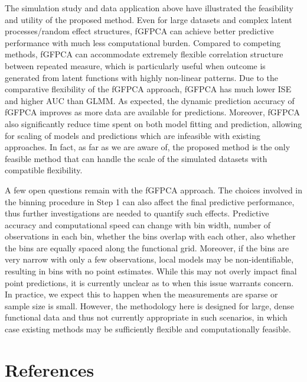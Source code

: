 \documentclass[
  11pt,
]{article}
\begin{document}
The simulation study and data application above have illustrated the
feasibility and utility of the proposed method. Even for large datasets
and complex latent processes/random effect structures, fGFPCA can
achieve better predictive performance with much less computational
burden. Compared to competing methods, fGFPCA can accommodate extremely
flexible correlation structure between repeated measure, which is
particularly useful when outcome is generated from latent functions with
highly non-linear patterns. Due to the comparative flexibility of the
fGFPCA approach, fGFPCA has much lower ISE and higher AUC than GLMM. As
expected, the dynamic prediction accuracy of fGFPCA improves as more
data are available for predictions. Moreover, fGFPCA also significantly
reduce time spent on both model fitting and prediction, allowing for
scaling of models and predictions which are infeasible with existing
approaches. In fact, as far as we are aware of, the proposed method is
the only feasible method that can handle the scale of the simulated
datasets with compatible flexibility.

A few open questions remain with the fGFPCA approach. The choices
involved in the binning procedure in Step 1 can also affect the final
predictive performance, thus further investigations are needed to
quantify such effects. Predictive accuracy and computational speed can
change with bin width, number of observations in each bin, whether the
bins overlap with each other, also whether the bins are equally spaced
along the functional grid. Moreover, if the bins are very narrow with
only a few observations, local models may be non-identifiable, resulting
in bins with no point estimates. While this may not overly impact final
point predictions, it is currently unclear as to when this issue
warrants concern. In practice, we expect this to happen when the
measurements are sparse or sample size is small. However, the
methodology here is designed for large, dense functional data and thus
not currently appropriate in such scenarios, in which case existing
methods may be sufficiently flexible and computationally feasible.

\hypertarget{references}{%
\section{References}\label{references}}
\end{document}
